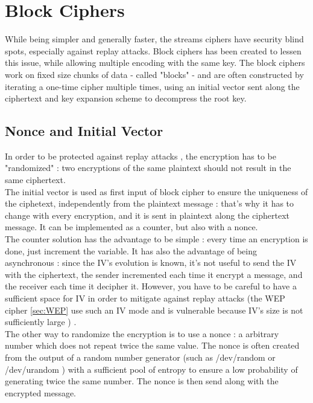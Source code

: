 \section{ Block Ciphers }

While being simpler and generally faster, the streams ciphers have security blind spots, especially against replay attacks. Block ciphers has been created to lessen this issue, while allowing multiple encoding with the same key. The block ciphers work on fixed size chunks of data - called "blocks" - and are often constructed by iterating a one-time cipher multiple times, using an initial vector sent along the ciphertext and key expansion scheme to decompress the root key.


\subsection{Nonce and Initial Vector}
\label{sec:randomization}

In order to be protected against replay attacks , the encryption has to be "randomized" : two encryptions of the same plaintext should not result in the same ciphertext. \\
The initial vector is used as first input of block cipher to ensure the uniqueness of the ciphetext, independently from the plaintext message : that's why it has to change with every encryption, and it is sent in plaintext along the ciphertext message. It can be implemented as a counter, but also with  a nonce.\\
The counter solution has the advantage to be simple : every time an encryption is done, just increment the variable. It has also the advantage of being asynchronous : since the IV's evolution is known, it's not useful to send the IV with the ciphertext, the sender incremented each time it encrypt a message, and the receiver each time it decipher it. However, you have to be careful to have a sufficient space for IV in order to mitigate against replay attacks (the WEP cipher \ref{sec:WEP} use such an IV mode and is vulnerable because IV's size is not sufficiently large )  . \\
The other way to randomize the encryption is to use a nonce : a arbitrary number which does not repeat twice the same value. The nonce is often created from the output of a random number generator (such as /dev/random or /dev/urandom ) with a sufficient pool of entropy to ensure a low probability of generating twice the same number. The nonce is then send along with the encrypted message. 

